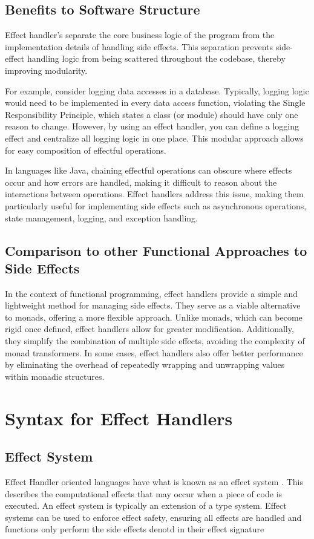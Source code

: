 \documentclass[logo,bsc,singlespacing,parskip]{infthesis}
\begin{document}
\subsection{Benefits to Software Structure}

Effect handler’s separate the core business logic of the program from the implementation details of handling side effects. This separation prevents side-effect handling logic from being scattered throughout the codebase, thereby improving modularity. 

For example, consider logging data accesses in a database. Typically, logging logic would need to be implemented in every data access function, violating the Single Responsibility Principle, which states a class (or module) should have only one reason to change. However, by using an effect handler, you can define a logging effect and centralize all logging logic in one place. This modular approach allows for easy composition of effectful operations. 

In languages like Java, chaining effectful operations can obscure where effects occur and how errors are handled, making it difficult to reason about the interactions between operations. Effect handlers address this issue, making them particularly useful for implementing side effects such as asynchronous operations, state management, logging, and exception handling. 

\subsection{Comparison to other Functional Approaches to Side Effects}
In the context of functional programming, effect handlers provide a simple and lightweight method for managing side effects. They serve as a viable alternative to monads, offering a more flexible approach. Unlike monads, which can become rigid once defined, effect handlers allow for greater modification. Additionally, they simplify the combination of multiple side effects, avoiding the complexity of monad transformers. In some cases, effect handlers also offer better performance by eliminating the overhead of repeatedly wrapping and unwrapping values within monadic structures. 


\section{Syntax for Effect Handlers}

\subsection{Effect System}
Effect Handler oriented languages have what is known as an effect system \cite{bauer_effect_2013}. This describes the computational effects that may occur when a piece of code is executed. An effect system is typically an extension of a type system. Effect systems can be used to enforce effect safety, ensuring all effects are handled and functions only perform the side effects denotd in their effect signature
\end{document}
